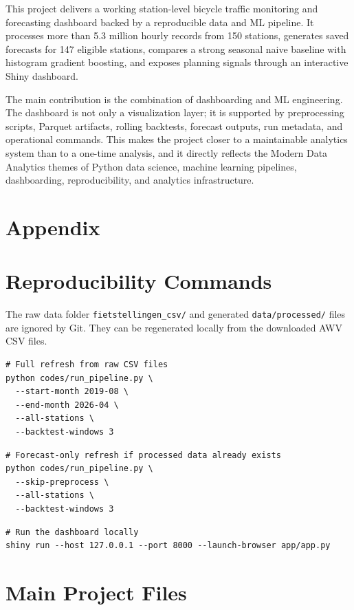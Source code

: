 \documentclass[11pt]{article}
\newcommand{\code}[1]{\texttt{#1}}
\begin{document}
This project delivers a working station-level bicycle traffic monitoring and forecasting dashboard backed by a reproducible data and ML pipeline. It processes more than 5.3 million hourly records from 150 stations, generates saved forecasts for 147 eligible stations, compares a strong seasonal naive baseline with histogram gradient boosting, and exposes planning signals through an interactive Shiny dashboard.

The main contribution is the combination of dashboarding and ML engineering. The dashboard is not only a visualization layer; it is supported by preprocessing scripts, Parquet artifacts, rolling backtests, forecast outputs, run metadata, and operational commands. This makes the project closer to a maintainable analytics system than to a one-time analysis, and it directly reflects the Modern Data Analytics themes of Python data science, machine learning pipelines, dashboarding, reproducibility, and analytics infrastructure.

\section*{Appendix}
\appendix
\section{Reproducibility Commands}

The raw data folder \code{fietstellingen\_csv/} and generated \code{data/processed/} files are ignored by Git. They can be regenerated locally from the downloaded AWV CSV files.

\begin{verbatim}
# Full refresh from raw CSV files
python codes/run_pipeline.py \
  --start-month 2019-08 \
  --end-month 2026-04 \
  --all-stations \
  --backtest-windows 3
\end{verbatim}

\begin{verbatim}
# Forecast-only refresh if processed data already exists
python codes/run_pipeline.py \
  --skip-preprocess \
  --all-stations \
  --backtest-windows 3
\end{verbatim}

\begin{verbatim}
# Run the dashboard locally
shiny run --host 127.0.0.1 --port 8000 --launch-browser app/app.py
\end{verbatim}

\section{Main Project Files}
\end{document}
